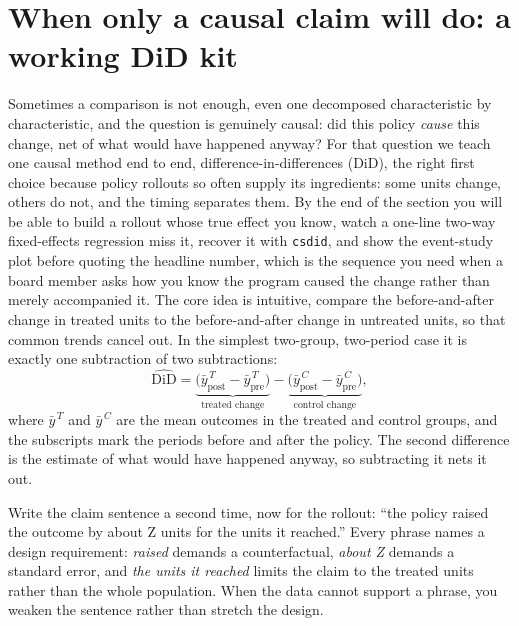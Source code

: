 \documentclass[
    a4paper,
    fontsize=10pt,
    twoside=true,
    numbers=noenddot,
]{kaobook}
\begin{document}
\section{When only a causal claim will do: a working DiD kit}\label{sec:did}
Sometimes a comparison is not enough, even one decomposed characteristic by characteristic, and the question is genuinely causal: did this policy \emph{cause} this change, net of what would have happened anyway? For that question we teach one causal method end to end, difference-in-differences (DiD), the right first choice because policy rollouts so often supply its ingredients: some units change, others do not, and the timing separates them. By the end of the section you will be able to build a rollout whose true effect you know, watch a one-line two-way fixed-effects regression miss it, recover it with \texttt{csdid}, and show the event-study plot before quoting the headline number, which is the sequence you need when a board member asks how you know the program caused the change rather than merely accompanied it. The core idea is intuitive, compare the before-and-after change in treated units to the before-and-after change in untreated units, so that common trends cancel out. In the simplest two-group, two-period case it is exactly one subtraction of two subtractions:
\[
\widehat{\text{DiD}}
=\underbrace{\big(\bar y^{\,T}_{\text{post}}-\bar y^{\,T}_{\text{pre}}\big)}_{\text{treated change}}
-\underbrace{\big(\bar y^{\,C}_{\text{post}}-\bar y^{\,C}_{\text{pre}}\big)}_{\text{control change}},
\]
where $\bar y^{\,T}$ and $\bar y^{\,C}$ are the mean outcomes in the treated and control groups, and the subscripts mark the periods before and after the policy. The second difference is the estimate of what would have happened anyway, so subtracting it nets it out.

Write the claim sentence a second time, now for the rollout: \enquote{the policy raised the outcome by about Z units for the units it reached.} Every phrase names a design requirement: \emph{raised} demands a counterfactual, \emph{about Z} demands a standard error, and \emph{the units it reached} limits the claim to the treated units rather than the whole population. When the data cannot support a phrase, you weaken the sentence rather than stretch the design.
\end{document}
